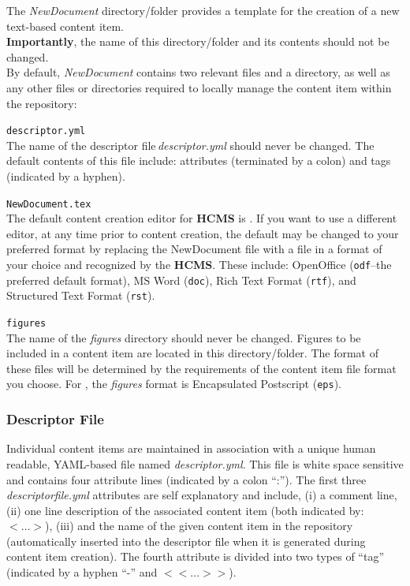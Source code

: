\documentclass[12pt]{article}
\begin{document}
The {\it NewDocument} directory/folder provides a template for the creation of a new text-based content item.\\
{\bf Importantly}, the name of this directory/folder and its contents should not be changed.\\
By default, {\it NewDocument} contains two relevant files and a directory, as well as any other {\bf \small} files or directories required to locally manage the content item within the repository:

\begin{description} 
	\item {\tt descriptor.yml}\\
	The name of the descriptor file\,{\it descriptor.yml} should never be changed. The default contents of this file include: attributes (terminated by a colon) and tags (indicated by a hyphen).
	\item {\tt NewDocument.tex}\\
	The default content creation editor for {\bf \small HCMS} is \LaTeXe. If you want to use a different editor, at any time prior to content creation, the default may be changed to your preferred format by replacing the NewDocument file with a file in a format of your choice and recognized by the {\bf \small HCMS}. These include: OpenOffice ({\tt odf}--the preferred default format), MS Word ({\tt doc}), Rich Text Format ({\tt rtf}), and Structured Text Format ({\tt rst}).
	\item {\tt figures}\\
	The name of the {\it figures} directory should never be changed. Figures to be included in a content item are located in this directory/folder. The format of these files will be determined by the requirements of the content item file format you choose. For \LaTeXe, the {\it figures} format is Encapsulated Postscript ({\tt eps}).
\end{description}

\subsubsection*{Descriptor File}

Individual content items are maintained in association with a unique human readable, YAML-based file named {\it descriptor.yml}. This file is white space sensitive and contains four attribute lines (indicated by a colon ``:''). The first three {\it descriptorfile.yml} attributes are self explanatory and include, (i) a comment line, (ii) one line description of the associated content item (both indicated by: {\small{$<\ldots>$}}), (iii) and the name of the given content item in the repository (automatically inserted into the descriptor file when it is generated during content item creation). The fourth attribute is divided into two types of ``tag'' (indicated by a hyphen ``-''  and {\small{$<<\ldots>>$}}).
\end{document}

